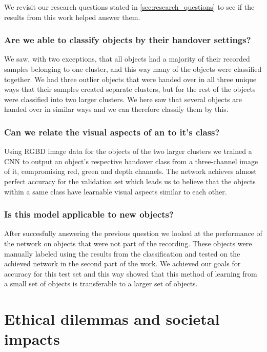 We revisit our research questions stated in \ref{sec:research_questions} to see if the results from this work helped answer them.

\subsubsection*{Are we able to classify objects by their handover settings?}

We saw, with two exceptions, that all objects had a majority of their recorded samples belonging to one cluster, and this way many of the objects were classified together. We had three outlier objects that were handed over in all three unique ways that their samples created separate clusters, but for the rest of the objects were classified into two larger clusters. We here saw that several objects are handed over in similar ways and we can therefore classify them by this.

\subsubsection*{Can we relate the visual aspects of an to it's class?}

Using RGBD image data for the objects of the two larger clusters we trained a CNN to output an object's respective handover class from a three-channel image of it, compromising red, green and depth channels. The network achieves almost perfect accuracy for the validation set which leads us to believe that the objects within a same class have learnable visual aspects similar to each other.

\subsubsection*{Is this model applicable to new objects?}

After succesfully answering the previous question we looked at the performance of the network on objects that were not part of the recording. These objects were manually labeled using the results from the classification and tested on the achieved network in the second part of the work. We achieved our goals for accuracy for this test set and this way showed that this method of learning from a small set of objects is transferable to a larger set of objects.



\section{Ethical dilemmas and societal impacts}

